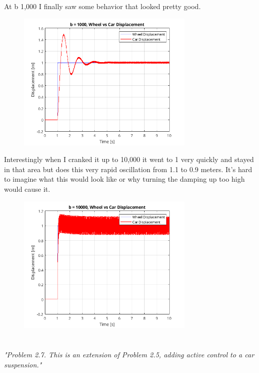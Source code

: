 \documentclass{article}
\begin{document}
At b 1,000 I finally saw some behavior that looked pretty good.

\begin{figure}[H]
    \centering
    \includegraphics[width=0.75\textwidth]{b1000sim.png}
\end{figure}

Interestingly when I cranked it up to 10,000 it went to 1 very quickly and stayed in that area but does this very rapid oscillation from 1.1 to 0.9 meters.
It's hard to imagine what this would look like or why turning the damping up too high would cause it.

\begin{figure}[H]
    \centering
    \includegraphics[width=0.75\textwidth]{b10000sim.png}
\end{figure}


\section{}

\textit{
    "Problem 2.7. This is an extension of Problem 2.5, adding active control to a car
    suspension."
}
\end{document}
